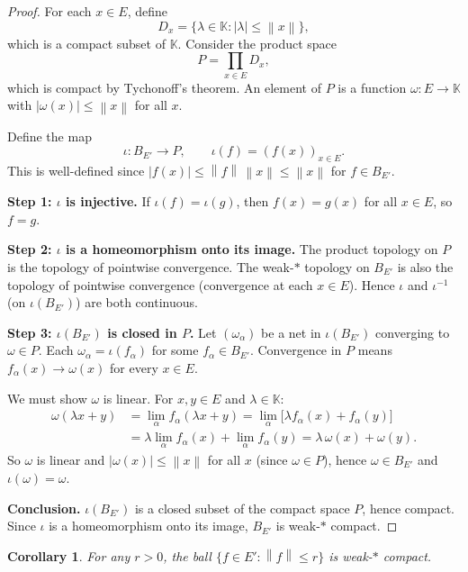\documentclass[a4paper,12pt]{book}
\newcommand{\K}{\mathbb{K}}
\newcommand{\norm}[1]{\left\| #1 \right\|}
\theoremstyle{definition}
\theoremstyle{plain}
\newtheorem{corollary}[definition]{Corollary}
\theoremstyle{remark}
\begin{document}
\begin{proof}
For each $x\in E$, define
\[
  D_x = \{\lambda\in\K : |\lambda|\le\norm{x}\},
\]
which is a compact subset of $\K$.  Consider the product space
\[
  P = \prod_{x\in E} D_x,
\]
which is compact by Tychonoff's theorem.  An element
of $P$ is a function $\omega: E\to\K$ with $|\omega(x)|\le\norm{x}$ for all $x$.

Define the map
\[
  \iota: B_{E'} \longrightarrow P, \qquad \iota(f) = (f(x))_{x\in E}.
\]
This is well-defined since $|f(x)|\le\norm{f}\,\norm{x}\le\norm{x}$ for
$f\in B_{E'}$.

\medskip\noindent\textbf{Step 1: $\iota$ is injective.}
If $\iota(f)=\iota(g)$, then $f(x)=g(x)$ for all $x\in E$, so $f=g$.

\medskip\noindent\textbf{Step 2: $\iota$ is a homeomorphism onto its image.}
The product topology on $P$ is the topology of pointwise convergence.
The weak-$*$ topology on $B_{E'}$ is also the topology of pointwise convergence
(convergence at each $x\in E$).  Hence $\iota$ and $\iota^{-1}$ (on $\iota(B_{E'})$)
are both continuous.

\medskip\noindent\textbf{Step 3: $\iota(B_{E'})$ is closed in $P$.}
Let $(\omega_\alpha)$ be a net in $\iota(B_{E'})$ converging to $\omega\in P$.
Each $\omega_\alpha = \iota(f_\alpha)$ for some $f_\alpha\in B_{E'}$.
Convergence in $P$ means $f_\alpha(x)\to\omega(x)$ for every $x\in E$.

We must show $\omega$ is linear.  For $x,y\in E$ and $\lambda\in\K$:
\begin{align*}
  \omega(\lambda x+y) &= \lim_\alpha f_\alpha(\lambda x+y)
  = \lim_\alpha \bigl[\lambda f_\alpha(x)+f_\alpha(y)\bigr] \\
  &= \lambda\lim_\alpha f_\alpha(x) + \lim_\alpha f_\alpha(y)
  = \lambda\,\omega(x)+\omega(y).
\end{align*}
So $\omega$ is linear and $|\omega(x)|\le\norm{x}$ for all $x$ (since
$\omega\in P$), hence $\omega\in B_{E'}$ and $\iota(\omega)=\omega$.

\medskip\noindent\textbf{Conclusion.}
$\iota(B_{E'})$ is a closed subset of the compact space $P$, hence compact.
Since $\iota$ is a homeomorphism onto its image, $B_{E'}$ is weak-$*$ compact.
\end{proof}

\begin{corollary}\label{cor:alaoglu-bounded}
For any $r>0$, the ball $\{f\in E': \norm{f}\le r\}$ is weak-$*$ compact.
\end{corollary}
\end{document}
